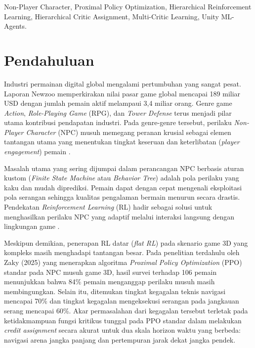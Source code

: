 \documentclass[conference]{IEEEtran}
\begin{document}
\begin{IEEEkeywords}
Non-Player Character, Proximal Policy Optimization, Hierarchical Reinforcement Learning, Hierarchical Critic Assignment, Multi-Critic Learning, Unity ML-Agents.
\end{IEEEkeywords}

\section{Pendahuluan}
Industri permainan digital global mengalami pertumbuhan yang sangat pesat. Laporan Newzoo \cite{newzoo2025} memperkirakan nilai pasar game global mencapai 189 miliar USD dengan jumlah pemain aktif melampaui 3,4 miliar orang. Genre game \textit{Action}, \textit{Role-Playing Game} (RPG), dan \textit{Tower Defense} terus menjadi pilar utama kontribusi pendapatan industri. Pada genre-genre tersebut, perilaku \textit{Non-Player Character} (NPC) musuh memegang peranan krusial sebagai elemen tantangan utama yang menentukan tingkat keseruan dan keterlibatan (\textit{player engagement}) pemain \cite{yannakakis2018artificial}.

Masalah utama yang sering dijumpai dalam perancangan NPC berbasis aturan kustom (\textit{Finite State Machine} atau \textit{Behavior Tree}) adalah pola perilaku yang kaku dan mudah diprediksi. Pemain dapat dengan cepat mengenali eksploitasi pola serangan sehingga kualitas pengalaman bermain menurun secara drastis. Pendekatan \textit{Reinforcement Learning} (RL) hadir sebagai solusi untuk menghasilkan perilaku NPC yang adaptif melalui interaksi langsung dengan lingkungan game \cite{sutton2018reinforcement}. 

Meskipun demikian, penerapan RL datar (\textit{flat RL}) pada skenario game 3D yang kompleks masih menghadapi tantangan besar. Pada penelitian terdahulu oleh Zaky (2025) yang menerapkan algoritma \textit{Proximal Policy Optimization} (PPO) standar pada NPC musuh game 3D, hasil survei terhadap 106 pemain menunjukkan bahwa 84\% pemain menganggap perilaku musuh masih membingungkan. Selain itu, ditemukan tingkat kegagalan teknis navigasi mencapai 70\% dan tingkat kegagalan mengeksekusi serangan pada jangkauan serang mencapai 60\%. Akar permasalahan dari kegagalan tersebut terletak pada ketidakmampuan fungsi kritikus tunggal pada PPO standar dalam melakukan \textit{credit assignment} secara akurat untuk dua skala horizon waktu yang berbeda: navigasi arena jangka panjang dan pertempuran jarak dekat jangka pendek.
\end{document}
